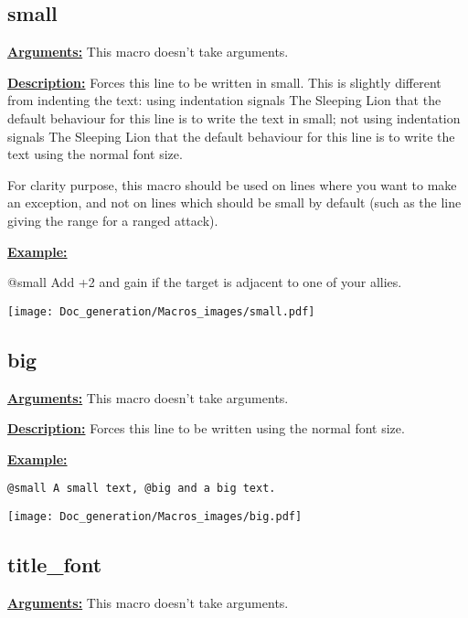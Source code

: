 \documentclass{article}
\begin{document}
\subsection{small}
\textbf{\underline{Arguments:}} This macro doesn't take arguments.

\textbf{\underline{Description:}} Forces this line to be written in small. This is slightly different from indenting the text: using indentation signals The Sleeping Lion that the default behaviour for this line is to write the text in small; not using indentation signals The Sleeping Lion that the default behaviour for this line is to write the text using the normal font size. 

For clarity purpose, this macro should be used on lines where you want to make an exception, and not on lines which should be small by default (such as the line giving the range for a ranged attack).

\textbf{\underline{Example:}}

\begin{spverbatim}
@small Add +2  and gain  if the target is adjacent to one of your allies.
\end{spverbatim}

\begin{center}
\texttt{[image: Doc\_generation/Macros\_images/small.pdf]}
\end{center}

\subsection{big}
\textbf{\underline{Arguments:}} This macro doesn't take arguments.

\textbf{\underline{Description:}} Forces this line to be written using the normal font size.

\textbf{\underline{Example:}}

\begin{center}
\begin{BVerbatim}
@small A small text, @big and a big text.
\end{BVerbatim}

\texttt{[image: Doc\_generation/Macros\_images/big.pdf]}
\end{center}


\subsection{title\_font}
\textbf{\underline{Arguments:}} This macro doesn't take arguments.
\end{document}
